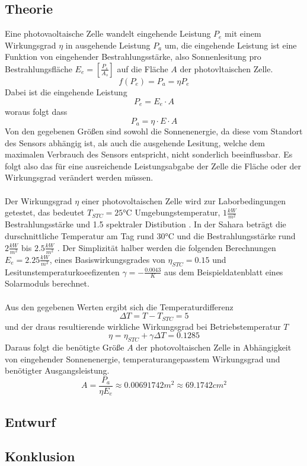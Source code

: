 \subsection{Theorie}
    Eine photovaoltaische Zelle wandelt eingehende Leistung \( P_e \) mit
    einem Wirkungsgrad \( \eta \) in ausgehende Leistung \( P_a \) um, die
    eingehende Leistung ist eine Funktion von eingehender Bestrahlungsstärke,
    also Sonnenlesitung pro Bestrahlungsfläche \( E_e = [\frac{P_s}{A_s}] \)
    auf die Fläche \( A \) der photovltaischen Zelle.
        \[ f(P_e) = P_a = \eta P_e \]
    Dabei ist die eingehende Leistung
        \[ P_e = E_e \cdot A\]
    woraus folgt dass
        \[ P_a = \eta \cdot E \cdot A \]
    Von den gegebenen Größen sind sowohl die Sonnenenergie, da diese vom
    Standort des Sensors abhängig ist, als auch die ausgehende Lesitung,
    welche dem maximalen Verbrauch des Sensors entspricht, nicht sonderlich
    beeinflussbar. Es folgt also das für eine ausreichende Leistungsabgabe
    der Zelle die Fläche oder der Wirkungsgrad verändert werden müssen.
    \\\\
    Der Wirkungsgrad \( \eta \) einer photovoltaischen Zelle wird zur
    Laborbedingungen getestet, das bedeutet \( T_{STC} = 25 \)°C
    Umgebungstemperatur, \( 1 \frac{kW}{m^2} \) Bestrahlungsstärke und
    1.5 spektraler Distibution \cite{Wiki_SolarEfficiency}. In der Sahara
    beträgt die durschnittliche Temperatur am Tag rund 30°C und die
    Bestrahlungsstärke rund \( 2 \frac{kW}{m^2} \) bis
    \( 2.5 \frac{kW}{m^2} \) \cite{Wiki_SolarAfrica}. Der Simplizität halber
    werden die folgenden Berechnungen \( E_e = 2.25 \frac{kW}{m^2} \), eines
    Basiswirkungsgrades von \( \eta_{STC} = 0.15 \) und
    Lesitunstemperaturkoeefizenten \( \gamma = -\frac{0.0043}{K} \) aus dem
    Beispieldatenblatt eines Solarmoduls berechnet. \cite{SolarDatasheet}
    \\\\
    Aus den gegebenen Werten ergibt sich die Temperaturdifferenz
        \[ \Delta T = T - T_{STC} = 5 \]
    und der draus resultierende wirkliche Wirkungsgrad bei Betriebstemperatur
    \( T \)
        \[ \eta = \eta_{STC} + \gamma \Delta T = 0.1285\]
    Daraus folgt die benötigte Größe \( A \) der photovoltaischen Zelle in
    Abhängigkeit von eingehender Sonnenenergie, temperaturangepasstem
    Wirkungsgrad und benötigter Ausgangsleistung.
        \[ A = \frac{P_a}{\eta E_e} \approx 0.00691742 m^2 \approx 69.1742 cm^2\]
\subsection{Entwurf}
\subsection{Konklusion}